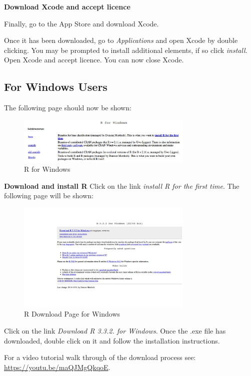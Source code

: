 \documentclass[12pt]{article}
\begin{document}
\textbf{Download Xcode and accept licence}

Finally, go to the App Store and download Xcode. 
 
Once it has been downloaded, go to \textit{Applications} and open Xcode by double clicking. You may be prompted to install additional elements, if so click \textit{install}. Open Xcode and accept licence. You can now close Xcode.

\subsection*{For Windows Users}
The following page should now be shown:

\begin{figure}[H]
	\centering
	\includegraphics[width=0.75\textwidth]{windowsR.jpg}
	\caption{R for Windows}
\end{figure}

\textbf{Download and install R}
Click on the link \textit{install R for the first time}. The following page will be shown:

\begin{figure}[H]
	\centering
	\includegraphics[width=0.75\textwidth]{windowsDL.jpg}
	\caption{R  Download Page for Windows}
\end{figure}

Click on the link \textit{Download R 3.3.2. for Windows}. Once the .exe file has downloaded, double click on it and follow the installation instructions. 

For a video tutorial walk through of the download process see: \url{https://youtu.be/maQJMgQkqoE}.
\end{document}
